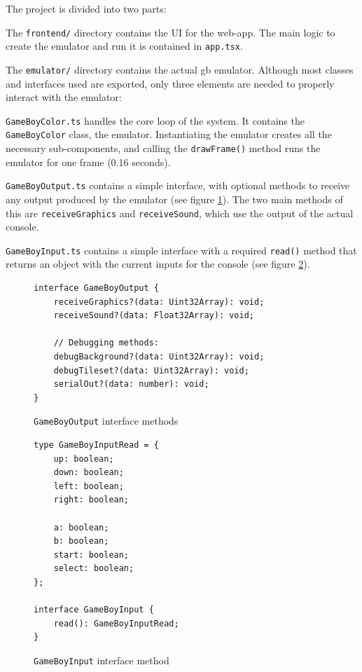 \documentclass[11pt]{report}
\begin{document}
The project is divided into two parts:
\begin{compactitem}
    \item The \texttt{frontend/} directory contains the UI for the web-app. The main logic to create the emulator and run it is contained in \texttt{app.tsx}.
    \item  The \texttt{emulator/} directory contains the actual \gls{gb} emulator. Although most classes and interfaces used are exported, only three elements are needed to properly interact with the emulator:
    \begin{compactitem}
        \item \texttt{GameBoyColor.ts} handles the core loop of the system. It contains the \texttt{GameBoyColor} class, the emulator. Instantiating the emulator creates all the necessary sub-components, and calling the \texttt{drawFrame()} method runs the emulator for one frame (0.16 seconds).
        \item \texttt{GameBoyOutput.ts} contains a simple interface, with optional methods to receive any output produced by the emulator (see figure \ref{fig:gameboyoutput}). The two main methods of this are \texttt{receiveGraphics} and \texttt{receiveSound}, which use the output of the actual console.
        \item \texttt{GameBoyInput.ts} contains a simple interface with a required \texttt{read()} method that returns an object with the current inputs for the console (see figure \ref{fig:gameboyinput}).
    \end{compactitem}
\end{compactitem}

\begin{figure}[h]
    \begin{verbatim}
interface GameBoyOutput {
    receiveGraphics?(data: Uint32Array): void;
    receiveSound?(data: Float32Array): void;

    // Debugging methods:
    debugBackground?(data: Uint32Array): void;
    debugTileset?(data: Uint32Array): void;
    serialOut?(data: number): void;
}
    \end{verbatim}
    \caption{\texttt{GameBoyOutput} interface methods}
    \label{fig:gameboyoutput}
\end{figure}

\begin{figure}[h]
    \begin{verbatim}
type GameBoyInputRead = {
    up: boolean;
    down: boolean;
    left: boolean;
    right: boolean;

    a: boolean;
    b: boolean;
    start: boolean;
    select: boolean;
};

interface GameBoyInput {
    read(): GameBoyInputRead;
}
    \end{verbatim}
    \caption{\texttt{GameBoyInput} interface method}
    \label{fig:gameboyinput}
\end{figure}
\end{document}
